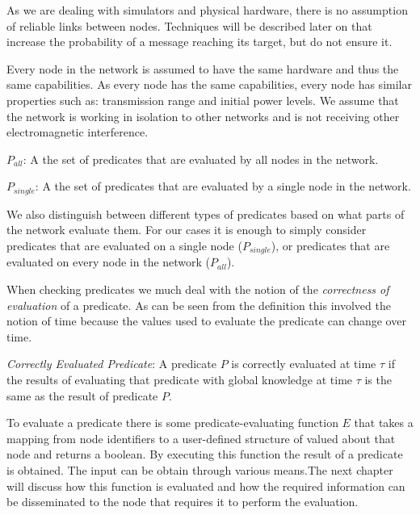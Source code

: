 As we are dealing with simulators and physical hardware, there is no assumption of reliable links between nodes. Techniques will be described later on that increase the probability of a message reaching its target, but do not ensure it.

Every node in the network is assumed to have the same hardware and thus the same capabilities. As every node has the same capabilities, every node has similar properties such as: transmission range and initial power levels. We assume that the network is working in isolation to other networks and is not receiving other electromagnetic interference.

\begin{mydef}
\emph{$P_{all}$}: A the set of predicates that are evaluated by all nodes in the network.
\end{mydef}

\begin{mydef}
\emph{$P_{single}$}: A the set of predicates that are evaluated by a single node in the network.
\end{mydef}

We also distinguish between different types of predicates based on what parts of the network evaluate them. For our cases it is enough to simply consider predicates that are evaluated on a single node ($P_{single}$), or predicates that are evaluated on every node in the network ($P_{all}$).

When checking predicates we much deal with the notion of the \emph{correctness of evaluation} of a predicate. As can be seen from the definition this involved the notion of time because the values used to evaluate the predicate can change over time.

\begin{mydef}
\emph{Correctly Evaluated Predicate}: A predicate $P$ is correctly evaluated at time $\tau$ if the results of evaluating that predicate with global knowledge at time $\tau$ is the same as the result of predicate $P$.
\end{mydef}

To evaluate a predicate there is some predicate-evaluating function $E$ that takes a mapping from node identifiers to a user-defined structure of valued about that node and returns a boolean. By executing this function the result of a predicate is obtained. The input can be obtain through various means.The next chapter will discuss how this function is evaluated and how the required information can be disseminated to the node that requires it to perform the evaluation.

